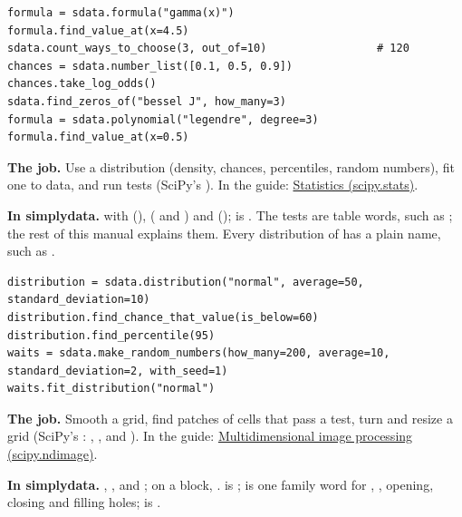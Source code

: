 \begin{lstlisting}[style=py]
formula = sdata.formula("gamma(x)")
formula.find_value_at(x=4.5)
sdata.count_ways_to_choose(3, out_of=10)                 # 120
chances = sdata.number_list([0.1, 0.5, 0.9])
chances.take_log_odds()
sdata.find_zeros_of("bessel J", how_many=3)
formula = sdata.polynomial("legendre", degree=3)
formula.find_value_at(x=0.5)
\end{lstlisting}


\textbf{The job.} Use a distribution (density, chances, percentiles, random numbers), fit one to data,
and run tests (SciPy's ). In the guide:
\href{https://docs.scipy.org/doc/scipy/tutorial/stats.html}{Statistics (scipy.stats)}.

\textbf{In simplydata.}  with  (),
 ( and ) and  ();
 is . The tests are table words, such as
; the rest of this manual explains them. Every distribution of
 has a plain name, such as .

\begin{lstlisting}[style=py]
distribution = sdata.distribution("normal", average=50, standard_deviation=10)
distribution.find_chance_that_value(is_below=60)
distribution.find_percentile(95)
waits = sdata.make_random_numbers(how_many=200, average=10, standard_deviation=2, with_seed=1)
waits.fit_distribution("normal")
\end{lstlisting}


\textbf{The job.} Smooth a grid, find patches of cells that pass a test, turn and resize a grid
(SciPy's : , ,  and ).
In the guide: \href{https://docs.scipy.org/doc/scipy/tutorial/ndimage.html}{Multidimensional image
processing (scipy.ndimage)}.

\textbf{In simplydata.} , ,  and
; on a block, .  is
;  is one family word for ,
, opening, closing and filling holes;  is
.

